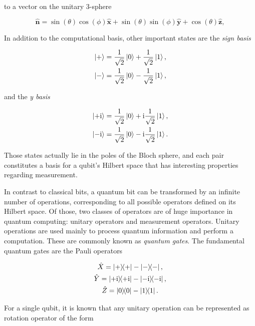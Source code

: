   \noindent to a vector on the unitary 3-sphere

  \begin{equation}
    \hat{\mathbf{n}} = \sin(\theta) \cos(\phi) \hat{\mathbf{x}}  + \sin(\theta) \sin(\phi)\hat{\mathbf{y}} + \cos(\theta) \hat{\mathbf{z}},
    \label{eq:bloch-vector}
  \end{equation}

  In addition to the computational basis, other important states are the \textit{sign basis}

  \begin{gather}
    \ket{+} = \frac{1}{\sqrt{2}}\ket{0} + \frac{1}{\sqrt{2}}\ket{1}, \\
    \ket{-} = \frac{1}{\sqrt{2}}\ket{0} - \frac{1}{\sqrt{2}}\ket{1},
    \label{eq:sign-basis}
  \end{gather}

  \noindent and the \textit{y basis}

  \begin{gather}
    \ket{+\mathrm{i}} = \frac{1}{\sqrt{2}}\ket{0} + \mathrm{i}\frac{1}{\sqrt{2}}\ket{1}, \\
    \ket{-\mathrm{i}} = \frac{1}{\sqrt{2}}\ket{0} - \mathrm{i}\frac{1}{\sqrt{2}}\ket{1}.
    \label{eq:phase-basis}
  \end{gather}

  \noindent Those states actually lie in the poles of the Bloch sphere, and each pair constitutes a basis for a qubit's Hilbert space that has interesting properties regarding measurement.

  In contrast to classical bits, a quantum bit can be transformed by an infinite number of operations, corresponding to all possible operators defined on its Hilbert space. Of those, two classes of operators are of huge importance in quantum computing: unitary operators and measurement operators. Unitary operations are used mainly to process quantum information and perform a computation. These are commonly known as \textit{quantum gates}. The fundamental quantum gates are the Pauli operators

  \begin{gather}
    \hat{X} = \ketbra{+}{+} - \ketbra{-}{-}, \\
    \hat{Y} = \ketbra{+\mathrm{i}}{+\mathrm{i}} - \ketbra{-\mathrm{i}}{-\mathrm{i}}, \\
    \hat{Z} = \ketbra{0}{0} - \ketbra{1}{1}.
    \label{eq:pauli-ops}
  \end{gather}
  
  
  For a single qubit, it is known that any unitary operation can be represented as rotation operator of the form

